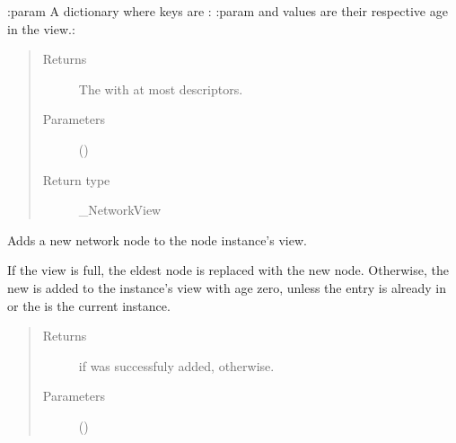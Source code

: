 \documentclass[letterpaper,10pt,english]{sphinxmanual}
\begin{document}
\begin{fulllineitems}
\begin{fulllineitems}
:param A dictionary where keys are {\hyperref[\detokenize{app.domain:app.domain.network_nodes.Node}]{}}:
:param and values are their respective age in the view.:
\begin{quote}\begin{description}
\item[{Returns}] \leavevmode
The  with at most  descriptors.

\item[{Parameters}] \leavevmode
{} () \textendash{} 

\item[{Return type}] \leavevmode
\_NetworkView

\end{description}\end{quote}

\end{fulllineitems}


\begin{fulllineitems}
\label{\detokenize{app.domain:app.domain.network_nodes.NewscastNode.add_neighbor}}
Adds a new network node to the node instance’s view.

If the view is full, the eldest node is replaced with the new node.
Otherwise, the new {\hyperref[\detokenize{app.domain:app.domain.network_nodes.NewscastNode}]{}} is added to the
instance’s view with age zero, unless the entry is already in
{\hyperref[\detokenize{app.domain:app.domain.network_nodes.NewscastNode.view}]{}} or the  is the current 
instance.
\begin{quote}\begin{description}
\item[{Returns}] \leavevmode
{} if  was successfuly added,  otherwise.

\item[{Parameters}] \leavevmode
{} ({\hyperref[\detokenize{app.domain:app.domain.network_nodes.NewscastNode}]{}}) \textendash{} 


\end{description}
\end{quote}
\end{fulllineitems}
\end{fulllineitems}
\end{document}
